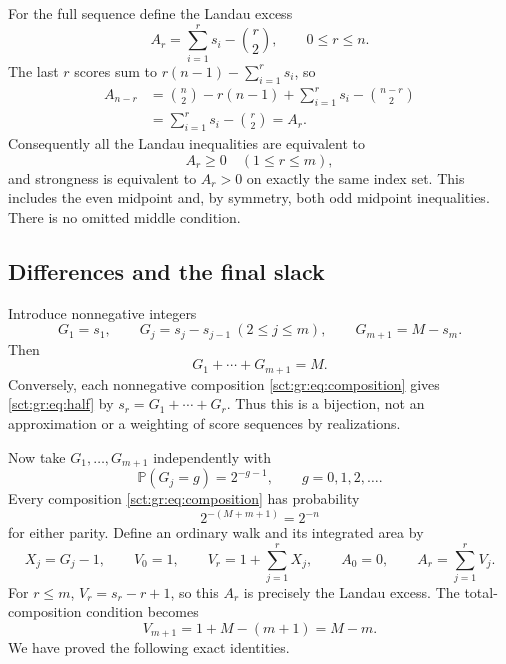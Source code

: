 \documentclass[11pt,letterpaper]{article}
\theoremstyle{definition}\newtheorem{remark}[theorem]{Remark}
\newcommand{\Pp}{\mathbb P}\newcommand{\Ee}{\mathbb E}
\begin{document}
For the full sequence define the Landau excess
\[
 A_r=\sum_{i=1}^r s_i-\binom{r}{2},\qquad 0\le r\le n.
\]
The last $r$ scores sum to $r(n-1)-\sum_{i=1}^r s_i$, so
\begin{align*}
 A_{n-r}
 &= \binom{n}{2}-r(n-1)+\sum_{i=1}^r s_i-\binom{n-r}{2}\\
 &=\sum_{i=1}^r s_i-\binom{r}{2}=A_r.
\end{align*}
Consequently all the Landau inequalities are equivalent to
\begin{equation}\label{sct:gr:eq:half-landau}
 A_r\ge0\quad(1\le r\le m),
\end{equation}
and strongness is equivalent to $A_r>0$ on exactly the same index set.
This includes the even midpoint and, by symmetry, both odd midpoint
inequalities. There is no omitted middle condition.

\subsection{Differences and the final slack}

Introduce nonnegative integers
\begin{equation}\label{sct:gr:eq:gaps}
 G_1=s_1,\qquad G_j=s_j-s_{j-1}\ (2\le j\le m),
 \qquad G_{m+1}=M-s_m.
\end{equation}
Then
\begin{equation}\label{sct:gr:eq:composition}
 G_1+\cdots+G_{m+1}=M.
\end{equation}
Conversely, each nonnegative composition \eqref{sct:gr:eq:composition} gives
\eqref{sct:gr:eq:half} by $s_r=G_1+\cdots+G_r$. Thus this is a bijection,
not an approximation or a weighting of score sequences by realizations.

Now take $G_1,\ldots,G_{m+1}$ independently with
\begin{equation}\label{sct:gr:eq:geom}
 \Pp(G_j=g)=2^{-g-1},\qquad g=0,1,2,\ldots.
\end{equation}
Every composition \eqref{sct:gr:eq:composition} has probability
\[
 2^{-(M+m+1)}=2^{-n}
\]
for either parity. Define an ordinary walk and its integrated area by
\begin{equation}\label{sct:gr:eq:walk}
 X_j=G_j-1,\qquad V_0=1,\qquad
 V_r=1+\sum_{j=1}^r X_j,\qquad A_0=0,\qquad
 A_r=\sum_{j=1}^r V_j.
\end{equation}
For $r\le m$, $V_r=s_r-r+1$, so this $A_r$ is precisely the Landau excess.
The total-composition condition becomes
\[
 V_{m+1}=1+M-(m+1)=M-m.
\]
We have proved the following exact identities.
\end{document}
